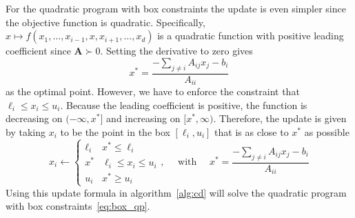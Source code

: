 \documentclass[10pt, letterpaper]{article}
\newcommand{\bx}{\boldsymbol x} %
\newcommand{\R}{\mathbb{R}} %
\newcommand{\bzero}{{\bf 0}}
\newcommand{\bg}{\boldsymbol \gamma}
\begin{document}
For the quadratic program with box constraints the update is even simpler since the objective function is quadratic.  Specifically, $x\mapsto f(x_1,\ldots,x_{i-1}, x , x_{i+1}, \ldots, x_d)$ is a quadratic function with positive leading coefficient since ${\boldsymbol A} \succ 0$.  Setting the derivative to zero gives
\[
x^* =  \frac{-\sum_{j\neq i} A_{ij}x_j  - b_i}{ A_{ii} }
\]
as the optimal point.  However, we have to enforce the constraint that $\ell_i \le x_i \le u_i$.  Because the leading coefficient is positive, the function is decreasing on $(-\infty, x^*]$ and increasing on $[x^*,\infty)$.  Therefore, the update is given by taking $x_i$ to be the point in the box $[\ell_i, u_i]$ that is as close to $x^*$ as possible
\begin{equation}
x_i \leftarrow  \begin{cases}
\ell_i & x^* \le \ell_i\\
x^* & \ell_i \le x_i \le u_i\\
u_i & x^* \ge u_i
\end{cases}, \quad \text{ with } \quad 
x^* =  \frac{-\sum_{j\neq i} A_{ij}x_j  - b_i}{ A_{ii} }
\label{eq:boxqp_update}
\end{equation}
Using this update formula in algorithm~\ref{alg:cd} will solve the quadratic program with box constraints~\ref{eq:box_qp}.\\


\end{document}
